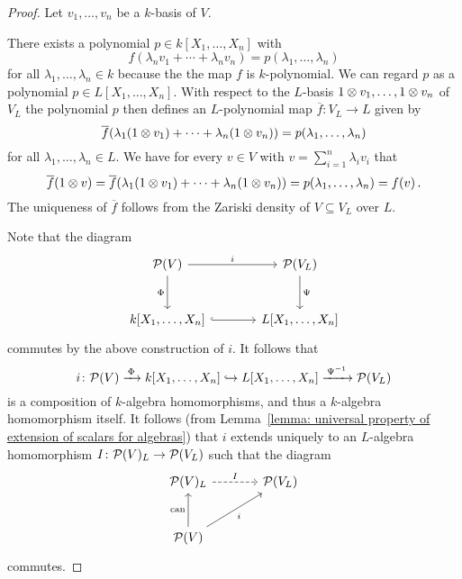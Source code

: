 \begin{proof}
    Let $v_1, \dotsc, v_n$ be a $k$-basis of $V$.
    
    There exists a polynomial $p \in k[X_1, \dotsc, X_n]$ with
    \[
        f(\lambda_n v_1 + \dotsb + \lambda_n v_n)
      = p(\lambda_1, \dotsc, \lambda_n)
    \]
    for all $\lambda_1, \dotsc, \lambda_n \in k$ because the the map $f$ is $k$-polynomial.
    We can regard $p$ as a polynomial $p \in L[X_1, \dotsc, X_n]$.
    With respect to the $L$-basis $1 \mathbin{\otimes} v_1, \dotsc, 1 \mathbin{\otimes} v_n$ of $V_L$ the polynomial $p$ then defines an $L$-polynomial map $\overline{f} \colon V_L \to L$ given by
    \[
        \overline{f}(\lambda_1 (1 \mathbin{\otimes} v_1) + \dotsb + \lambda_n (1 \mathbin{\otimes} v_n))
      = p(\lambda_1, \dotsc, \lambda_n)
    \]
    for all $\lambda_1, \dotsc, \lambda_n \in L$.
    We have for every $v \in V$ with $v = \sum_{i=1}^n \lambda_i v_i$ that
    \[
        \overline{f}(1 \mathbin{\otimes} v)
      = \overline{f}(\lambda_1 (1 \mathbin{\otimes} v_1) + \dotsb + \lambda_n (1 \mathbin{\otimes} v_n))
      = p(\lambda_1, \dotsc, \lambda_n)
      = f(v) \,.
    \]
    The uniqueness of $\overline{f}$ follows from the Zariski density of $V \subseteq V_L$ over $L$.
    
    Note that the diagram
    \[
      \begin{tikzcd}[sep = large]
          \mc{P}(V)
          \arrow{r}[above]{i}
          \arrow{d}[left]{\Phi}
        & \mc{P}(V_L)
          \arrow{d}[right]{\Psi}
        \\
          k[X_1, \dotsc, X_n]
          \arrow[hook]{r}
        & L[X_1, \dotsc, X_n]
      \end{tikzcd}
    \]
    commutes by the above construction of $i$.
    It follows that
    \[
                                  i
      \colon                      \mathcal{P}(V)
      \xrightarrow{\,\Phi\,}      k[X_1, \dotsc, X_n]
      \hookrightarrow             L[X_1, \dotsc, X_n]
      \xrightarrow{\,\Psi^{-1}\,} \mathcal{P}(V_L)
    \]
    is a composition of $k$-algebra homomorphisms, and thus a $k$-algebra homomorphism itself.
    It follows (from Lemma~\ref{lemma: universal property of extension of scalars for algebras}) that $i$ extends uniquely to an $L$-algebra homomorphism $I \colon \mathcal{P}(V)_L \to \mathcal{P}(V_L)$ such that the diagram
    \[
      \begin{tikzcd}[sep = large]
          \mc{P}(V)_L
          \arrow[dashed]{r}[above]{I}
        & \mc{P}(V_L)
        \\
          \mc{P}(V)
          \arrow{u}[left]{\can}
          \arrow{ru}[below right]{i}
        & {}
      \end{tikzcd}
    \]
    commutes.
    

\end{proof}
